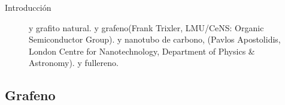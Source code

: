 \documentclass[aspectratio=169]{beamer}
\begin{document}
\begin{frame}{Introducción}
\begin{figure}
\begin{subfigure}[b]{0.15\textwidth}
				\caption{}
				\label{fig:fullerene_image}
			\end{subfigure}
			\caption[Alótropos del carbono mostrando las diferentes dimensionalidades de los nanomateriales]{ y  grafito natural.  y  grafeno(Frank Trixler, LMU/CeNS: Organic Semiconductor Group).  y  nanotubo de carbono, (Pavlos Apostolidis, London Centre for Nanotechnology, Department of Physics \& Astronomy).  y  fullereno\citep{Gimenez2011}.}
			\label{fig:carbon_allotropes}
		\end{figure}
	\end{frame}

	\subsection{Grafeno}
\end{document}
